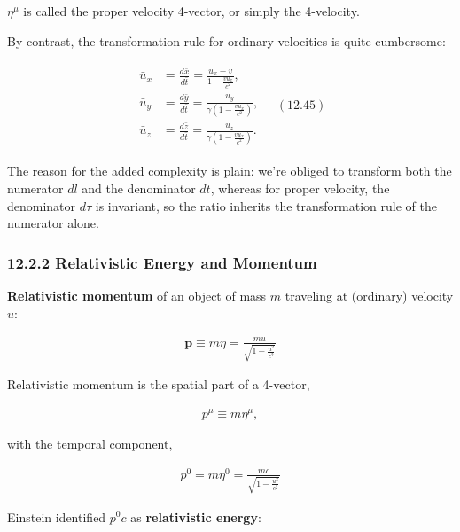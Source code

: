 \documentclass[12pt]{book}
\newcommand{\bm}[1]{\boldsymbol{#1}}
\begin{document}
        \(\eta^\mu\) is called the proper velocity 4-vector, or simply the 4-velocity.
        
        By contrast, the transformation rule for ordinary velocities is quite cumbersome:
        
        \begin{align}
        \begin{aligned}
        \bar{u}_x &= \frac{d\bar{x}}{d\bar{t}} = \frac{u_x - v}{1 - \frac{vu_x}{c^2}}, \\
        \bar{u}_y &= \frac{d\bar{y}}{d\bar{t}} = \frac{u_y}{\gamma \left(1 - \frac{vu_x}{c^2}\right)}, \\
        \bar{u}_z &= \frac{d\bar{z}}{d\bar{t}} = \frac{u_z}{\gamma \left(1 - \frac{vu_x}{c^2}\right)}.
        \end{aligned} \quad (12.45)
        \end{align}
        
        The reason for the added complexity is plain: we’re obliged to transform both the numerator \(dl\) and the denominator \(dt\), whereas for proper velocity, the denominator \(d\tau\) is invariant, so the ratio inherits the transformation rule of the numerator
        alone.
        
    \subsubsection{12.2.2 Relativistic Energy and Momentum}
        \textbf{Relativistic momentum} of an object of mass \(m\) traveling at (ordinary) velocity \(u\):
        
        \begin{align}
        \bm{p} \equiv m\eta = \frac{mu}{\sqrt{1 - \frac{u^2}{c^2}}}
        \end{align}
        
        Relativistic momentum is the spatial part of a 4-vector,
        
        \begin{align}
        p^\mu \equiv m\eta^\mu,
        \end{align}
        
        with the temporal component,
        
        \begin{align}
        p^0 = m\eta^0 = \frac{mc}{\sqrt{1 - \frac{u^2}{c^2}}}
        \end{align}
        
        Einstein identified \(p^0c\) as \textbf{relativistic energy}:
        
\end{document}
